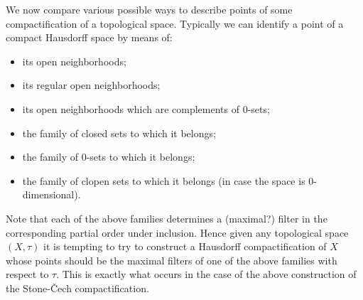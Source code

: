 \documentclass[11pt]{amsart}
\theoremstyle{plain}
\theoremstyle{definition}
\theoremstyle{plain}
\theoremstyle{remark}
\newcommand{\0}{\mathsf{0}}
\renewcommand{\1}{\mathsf{1}}
\renewcommand{\2}{\mathsf{2}}
\theoremstyle{definition}
\begin{document}
We now compare various possible ways to describe points of some compactification of 
a topological space. Typically we can identify a point of a compact Hausdorff space by means of:
\begin{itemize}
\item its open neighborhoods;
\item its regular open neighborhoods;
\item its open neighborhoods which are complements of $0$-sets;
\item the family of closed sets to which it belongs;
\item the family of $0$-sets to which it belongs;
\item the family of clopen sets to which it belongs (in case the space is $0$-dimensional).
\end{itemize}
Note that each of the above families determines a (maximal?) filter in the corresponding partial order under inclusion.
Hence given any topological space $(X,\tau)$ it is tempting to try to construct a Hausdorff compactification of $X$ whose points should be the maximal filters of one of the above families with respect to $\tau$. This is exactly what occurs
in the case of the above construction of the Stone-\v{C}ech compactification.
\end{document}
